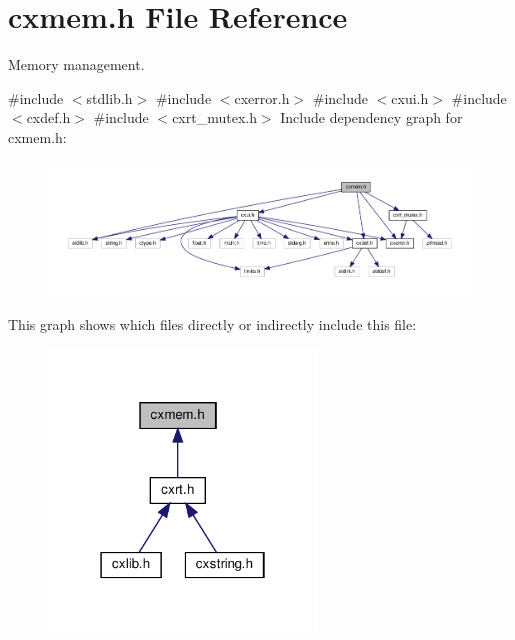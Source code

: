 \hypertarget{a00017}{}\section{cxmem.\+h File Reference}
\label{a00017}


Memory management.  


{\ttfamily \#include $<$stdlib.\+h$>$}\newline
{\ttfamily \#include $<$cxerror.\+h$>$}\newline
{\ttfamily \#include $<$cxui.\+h$>$}\newline
{\ttfamily \#include $<$cxdef.\+h$>$}\newline
{\ttfamily \#include $<$cxrt\+\_\+mutex.\+h$>$}\newline
Include dependency graph for cxmem.\+h\+:
\nopagebreak
\begin{figure}[H]
\begin{center}
\leavevmode
\includegraphics[width=350pt]{a00018}
\end{center}
\end{figure}
This graph shows which files directly or indirectly include this file\+:
\nopagebreak
\begin{figure}[H]
\begin{center}
\leavevmode
\includegraphics[width=202pt]{a00019}
\end{center}
\end{figure}
